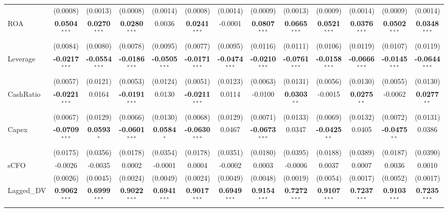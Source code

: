 \documentclass[11pt,a4paper]{article}
\begin{document}
\begin{table}[htbp]
\begin{tabular}{lcccccccccccc}
 & (0.0008) & (0.0013) & (0.0008) & (0.0014) & (0.0008) & (0.0014) & (0.0009) & (0.0013) & (0.0009) & (0.0014) & (0.0009) & (0.0014) \\
ROA & \textbf{0.0504}$^{***}$ & \textbf{0.0270}$^{***}$ & \textbf{0.0280}$^{***}$ & 0.0036 & \textbf{0.0241}$^{***}$ & -0.0001 & \textbf{0.0807}$^{***}$ & \textbf{0.0665}$^{***}$ & \textbf{0.0521}$^{***}$ & \textbf{0.0376}$^{***}$ & \textbf{0.0502}$^{***}$ & \textbf{0.0348}$^{***}$ \\
 & (0.0084) & (0.0080) & (0.0078) & (0.0095) & (0.0077) & (0.0095) & (0.0116) & (0.0111) & (0.0106) & (0.0119) & (0.0107) & (0.0119) \\
Leverage & \textbf{-0.0217}$^{***}$ & \textbf{-0.0554}$^{***}$ & \textbf{-0.0186}$^{***}$ & \textbf{-0.0505}$^{***}$ & \textbf{-0.0171}$^{***}$ & \textbf{-0.0474}$^{***}$ & \textbf{-0.0210}$^{***}$ & \textbf{-0.0761}$^{***}$ & \textbf{-0.0158}$^{***}$ & \textbf{-0.0666}$^{***}$ & \textbf{-0.0145}$^{***}$ & \textbf{-0.0644}$^{***}$ \\
 & (0.0057) & (0.0121) & (0.0053) & (0.0124) & (0.0051) & (0.0123) & (0.0063) & (0.0131) & (0.0056) & (0.0130) & (0.0055) & (0.0130) \\
CashRatio & \textbf{-0.0221}$^{***}$ & 0.0164 & \textbf{-0.0191}$^{***}$ & 0.0130 & \textbf{-0.0211}$^{***}$ & 0.0114 & -0.0100 & \textbf{0.0303}$^{**}$ & -0.0015 & \textbf{0.0275}$^{**}$ & -0.0062 & \textbf{0.0277}$^{**}$ \\
 & (0.0067) & (0.0129) & (0.0066) & (0.0130) & (0.0068) & (0.0129) & (0.0071) & (0.0133) & (0.0069) & (0.0132) & (0.0072) & (0.0131) \\
Capex & \textbf{-0.0709}$^{***}$ & \textbf{0.0593}$^{*}$ & \textbf{-0.0601}$^{***}$ & \textbf{0.0584}$^{*}$ & \textbf{-0.0630}$^{***}$ & 0.0467 & \textbf{-0.0673}$^{***}$ & 0.0347 & \textbf{-0.0425}$^{**}$ & 0.0405 & \textbf{-0.0475}$^{**}$ & 0.0386 \\
 & (0.0175) & (0.0356) & (0.0178) & (0.0354) & (0.0178) & (0.0351) & (0.0180) & (0.0395) & (0.0188) & (0.0389) & (0.0187) & (0.0390) \\
sCFO & -0.0026 & -0.0035 & 0.0002 & -0.0001 & 0.0004 & -0.0002 & 0.0003 & -0.0006 & 0.0037 & 0.0007 & 0.0036 & 0.0010 \\
 & (0.0026) & (0.0045) & (0.0024) & (0.0049) & (0.0024) & (0.0049) & (0.0048) & (0.0019) & (0.0054) & (0.0017) & (0.0052) & (0.0017) \\
Lagged\_DV & \textbf{0.9062}$^{***}$ & \textbf{0.6999}$^{***}$ & \textbf{0.9022}$^{***}$ & \textbf{0.6941}$^{***}$ & \textbf{0.9017}$^{***}$ & \textbf{0.6949}$^{***}$ & \textbf{0.9154}$^{***}$ & \textbf{0.7272}$^{***}$ & \textbf{0.9107}$^{***}$ & \textbf{0.7237}$^{***}$ & \textbf{0.9103}$^{***}$ & \textbf{0.7235}$^{***}$ \\

\end{tabular}
\end{table}
\end{document}
